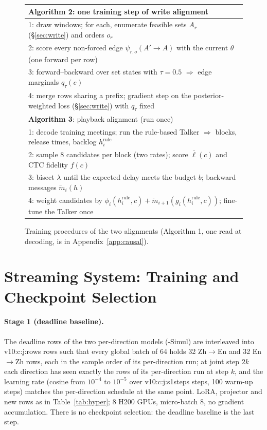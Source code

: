 \begin{figure}[t]
\small
\centering
\begin{tabular}{@{}l@{}}
\toprule
\textbf{Algorithm 2}: one training step of write alignment \\
\midrule
1: draw windows; for each, enumerate feasible sets $A_r$ (\S\ref{sec:write}) and orders $o_r$ \\
2: score every non-forced edge $\psi_{r,o}(A'\!\to\!A)$ with the current $\theta$ (one forward per row) \\
3: forward--backward over set states with $\tau=0.5$ $\Rightarrow$ edge marginals $q_\tau(e)$ \\
4: merge rows sharing a prefix; gradient step on the posterior-weighted loss (\S\ref{sec:write}) with $q_\tau$ fixed \\
\midrule
\textbf{Algorithm 3}: playback alignment (run once) \\
\midrule
1: decode training meetings; run the rule-based Talker $\Rightarrow$ blocks, release times, backlog $h^{\mathrm{rule}}_i$ \\
2: sample 8 candidates per block (two rates); score $\bar{\ell}(c)$ and CTC fidelity $f(c)$ \\
3: bisect $\lambda$ until the expected delay meets the budget $b$; backward messages $\overleftarrow{m}_i(h)$ \\
4: weight candidates by $\phi_i(h^{\mathrm{rule}}_i,c)+\overleftarrow{m}_{i+1}(g_i(h^{\mathrm{rule}}_i,c))$; fine-tune the Talker once \\
\bottomrule
\end{tabular}
\caption{Training procedures of the two alignments (Algorithm 1, one read at decoding, is in Appendix~\ref{app:causal}).}
\label{alg:train}
\end{figure}

\section{Streaming System: Training and Checkpoint Selection}
\label{app:v10train}

\paragraph{Stage 1 (deadline baseline).} The deadline rows of the two per-direction models (\sys{}-Simul) are
interleaved into \num{v10:c:j:rows} rows such that every global batch of 64 holds 32 Zh$\rightarrow$En and 32
En$\rightarrow$Zh rows, each in the sample order of its per-direction run; at joint step $2k$ each direction has seen
exactly the rows of its per-direction run at step $k$, and the learning rate (cosine from $10^{-4}$ to $10^{-5}$ over
\num{v10:c:j:s1steps} steps, 100 warm-up steps) matches the per-direction schedule at the same point. LoRA, projector and new rows as in Table~\ref{tab:hyper}; 8 H200 GPUs, micro-batch 8, no
gradient accumulation. There is no checkpoint selection: the deadline baseline is the last step.

